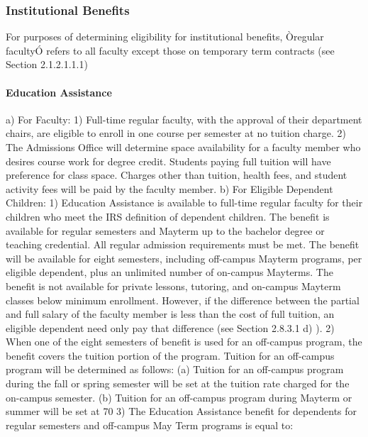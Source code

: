 \documentclass[letterpaper, 11pt]{article}
\begin{document}
		\subsubsection{Institutional Benefits}
			For purposes of determining eligibility for institutional benefits, Òregular facultyÓ refers to all faculty except those on temporary term contracts (see Section 2.1.2.1.1.1)
			\paragraph{Education Assistance}
				a) For Faculty:
				1) Full-time regular faculty, with the approval of their department chairs, are eligible to enroll in one course per semester at no tuition charge.
				2) The Admissions Office will determine space availability for a faculty member who desires course work for degree credit.  Students paying full tuition will have preference for class space.  Charges other than tuition, health fees, and student activity fees will be paid by the faculty member.
				b) For Eligible Dependent Children:
				1) Education Assistance is available to full-time regular faculty for their children who meet the IRS definition of dependent children.  The benefit is available for regular semesters and Mayterm up to the bachelor degree or teaching credential. All regular admission requirements must be met.  The benefit will be available for eight semesters, including off-campus Mayterm programs, per eligible dependent, plus an unlimited number of on-campus Mayterms.  The benefit is not available for private lessons, tutoring, and on-campus Mayterm classes below minimum enrollment.  However, if the difference between the partial and full salary of the faculty member is less than the cost of full tuition, an eligible dependent need only pay that difference (see Section 2.8.3.1 d) ).
				2) When one of the eight semesters of benefit is used for an off-campus program, the benefit covers the tuition portion of the program.  Tuition for an off-campus program will be determined as follows:
				(a) Tuition for an off-campus program during the fall or spring semester will be set at the tuition rate charged for the on-campus semester.
				(b) Tuition for an off-campus program during Mayterm or summer will be set at 70%
				3) The Education Assistance benefit for dependents for regular semesters and off-campus May Term programs is equal to:
\end{document}
